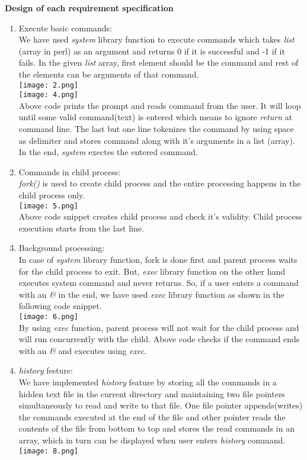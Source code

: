 \documentclass[12pt,twoside]{article}
\begin{document}
\textbf{Design of each requirement specification} \\
\begin{enumerate}
    \item Execute basic commands:\\
    \hfill \break
We have used \emph{system} library function to execute commands which takes \emph{list} (array in perl) as an argument and returns 0 if it is successful and -1 if it fails. In the given \emph{list} array, first element should be the command and rest of the elements can be arguments of that command. \\
\hfill \break
 \texttt{[image: 2.png]}\\
 \texttt{[image: 4.png]}\\
\hfill \break
Above code prints the prompt and reads command from the user. It will loop until some valid command(text) is entered which means to ignore \emph{return} at command line. The last but one line tokenizes the command by using space as delimiter and stores command along with it's arguments in a list (array). In the end, \emph{system} exectes the entered command.
\hfill \break
    \item Commands in child process:\\
\hfill \break
\emph{fork()} is used to create child process and the entire processing happens in the child process only.\\
\hfill \break
\texttt{[image: 5.png]}\\
\hfill \break
Above code snippet creates child process and check it's validity. Child process execution starts from the last line.
\hfill \break
\hfill \break
\hfill \break
    \item Background processing:\\
\hfill \break
In case of \emph{system} library function, fork is done first and parent process waits for the child process to exit. But, \emph{exec} library function on the other hand executes system command and never returns. So, if a user enters a command with an \emph{\&} in the end, we have used \emph{exec} library function as shown in the following code snippet.\\
\hfill \break
\texttt{[image: 6.png]}\\
\hfill \break
By using \emph{exec} function, parent process will not wait for the child process and will run concurrently with the child. Above code checks if the command ends with an \emph{\&} and executes using \emph{exec}.
\hfill \break
    \item \emph{history} festure:\\
\hfill \break
We have implemented \emph{history} feature by storing all the commands in a hidden text file in the current directory and maintaining two file pointers simultaneously to read and write to that file. One file pointer appends(writes) the commands executed at the end of the file and other pointer reads the contents of the file from bottom to top and stores the read commands in an array, which in turn can be displayed when user enters \emph{history} command.\\
\hfill \break
\texttt{[image: 8.png]}


\end{enumerate}
\end{document}
